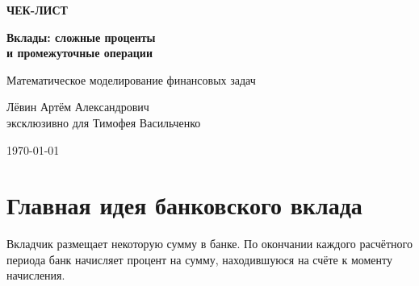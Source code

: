 \documentclass[a4paper,12pt]{article}
\begin{document}
\begin{titlepage}
\thispagestyle{empty}
\centering

\vspace*{28mm}

{\Large\color{accent}\textbf{ЧЕК-ЛИСТ}\par}

\vspace{8mm}

{\huge\bfseries\color{darkaccent}
Вклады: сложные проценты\\[2mm]
и промежуточные операции
\par}

\vspace{13mm}

{\large
Математическое моделирование финансовых задач
\par}

\vspace{24mm}

{\large
Лёвин Артём Александрович\\[2mm]
эксклюзивно для Тимофея Васильченко
\par}

\vspace{12mm}

{\large \today\par}

\vfill


\vspace{7mm}

\end{titlepage}

\section{Главная идея банковского вклада}

Вкладчик размещает некоторую сумму в банке. По окончании каждого расчётного
периода банк начисляет процент на сумму, находившуюся на счёте к моменту
начисления.
\end{document}

